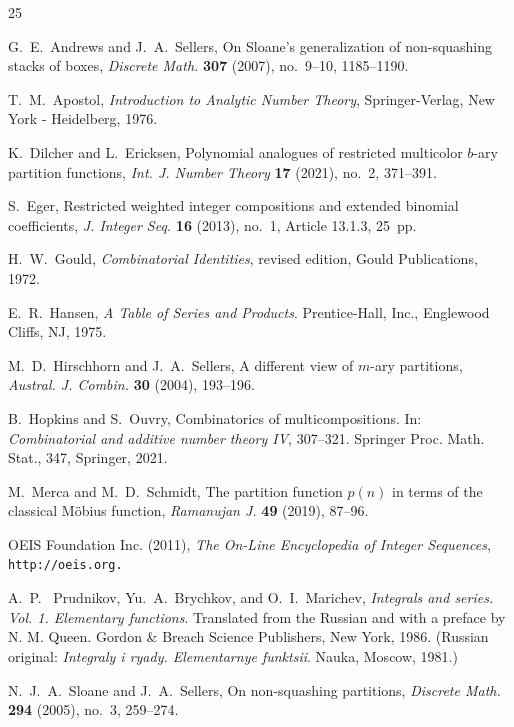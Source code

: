\documentclass{amsart}
\theoremstyle{plain}
\numberwithin{equation}{section}
\begin{document}
\begin{thebibliography}{25}

 G.~E.~Andrews and J.~A.~Sellers, 
On Sloane's generalization of non-squashing stacks of boxes,
{\it Discrete Math.} {\bf 307} (2007), no.~9--10, 1185--1190.

 T.~M.~Apostol, {\it Introduction to Analytic Number Theory\/},
Springer-Verlag, New York - Heidelberg, 1976.

 K.~Dilcher and L.~Ericksen, Polynomial analogues of restricted
multicolor $b$-ary partition functions, {\it Int. J. Number Theory} {\bf 17}
(2021), no.~2, 371--391.

 S.~Eger, Restricted weighted integer compositions and extended 
binomial coefficients,
{\it J. Integer Seq.} {\bf 16} (2013), no.~1, Article 13.1.3, 25~pp.

 H.~W.~Gould, {\it Combinatorial Identities\/},
revised edition, Gould Publications, 1972.

 E.~R.~Hansen, {\it  A Table of Series and Products\/}.
Prentice-Hall, Inc., Englewood Cliffs, NJ, 1975.

 M.~D.~Hirschhorn and J.~A.~Sellers, A different view of $m$-ary 
partitions, {\it Austral. J. Combin.} {\bf 30} (2004), 193--196. 

 B.~Hopkins and S.~Ouvry, Combinatorics of multicompositions. 
In: {\it Combinatorial and additive number theory IV}, 307--321.
Springer Proc. Math. Stat., 347, Springer, 2021.

 M.~Merca and M.~D.~Schmidt, The partition function $p(n)$ in 
terms of the classical M\"obius function, {\it Ramanujan J.} {\bf 49} (2019),
87--96.

OEIS Foundation Inc. (2011), {\it The On-Line Encyclopedia of Integer 
Sequences},\\
\tt{http://oeis.org}.\rm

 A.~P.~ Prudnikov, Yu.~A.~Brychkov, and O.~I.~Marichev,
{\it Integrals and series. Vol. 1. Elementary functions\/}. Translated from
the Russian and with a preface by N. M. Queen. Gordon \& Breach Science
Publishers, New York, 1986. (Russian original:
{\it Integraly i ryady. Elementarnye funktsii\/}. Nauka, Moscow, 1981.)

 N.~J.~A.~Sloane and J.~A.~Sellers, 
On non-squashing partitions, {\it Discrete Math.} {\bf 294} (2005), no.~3, 
259--274.

\end{thebibliography}
\end{document}
